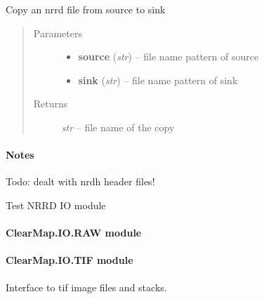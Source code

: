 \documentclass[letterpaper,10pt,english]{sphinxmanual}
\begin{document}

\begin{fulllineitems}
\label{api/ClearMap.IO:ClearMap.IO.NRRD.copyData}
Copy an nrrd file from source to sink
\begin{quote}\begin{description}
\item[{Parameters}] \leavevmode\begin{itemize}
\item {} 
\textbf{source} (\emph{str}) --
file name pattern of source

\item {} 
\textbf{sink} (\emph{str}) --
file name pattern of sink

\end{itemize}

\item[{Returns}] \leavevmode
\emph{str} --
file name of the copy

\end{description}\end{quote}
\paragraph{Notes}

Todo: dealt with nrdh header files!

\end{fulllineitems}


\begin{fulllineitems}
\label{api/ClearMap.IO:ClearMap.IO.NRRD.test}
Test NRRD IO module

\end{fulllineitems}



\paragraph{ClearMap.IO.RAW module}
\label{api/ClearMap.IO:clearmap-io-raw-module}

\paragraph{ClearMap.IO.TIF module}
\label{api/ClearMap.IO:clearmap-io-tif-module}\label{api/ClearMap.IO:module-ClearMap.IO.TIF}
Interface to tif image files and stacks.
\end{document}
